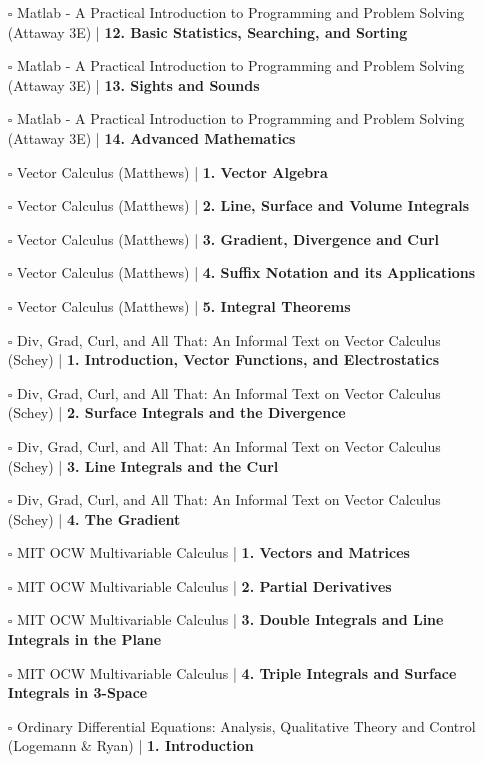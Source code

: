 \documentclass[a4, landscape, 12pt]{article}
\newcommand{\checkbox}{$\square$}%
\begin{document}
\begin{itemize}
{}
\item [\checkbox] Matlab - A Practical Introduction to Programming and Problem Solving (Attaway 3E)  | \textbf{12. Basic Statistics, Searching, and Sorting
}
\item [\checkbox] Matlab - A Practical Introduction to Programming and Problem Solving (Attaway 3E)  | \textbf{13. Sights and Sounds
}
\item [\checkbox] Matlab - A Practical Introduction to Programming and Problem Solving (Attaway 3E)  | \textbf{14. Advanced Mathematics
}
\item [\checkbox] Vector Calculus (Matthews)  | \textbf{1. Vector Algebra
}
\item [\checkbox] Vector Calculus (Matthews)  | \textbf{2. Line, Surface and Volume Integrals
}
\item [\checkbox] Vector Calculus (Matthews)  | \textbf{3. Gradient, Divergence and Curl
}
\item [\checkbox] Vector Calculus (Matthews)  | \textbf{4. Suffix Notation and its Applications
}
\item [\checkbox] Vector Calculus (Matthews)  | \textbf{5. Integral Theorems
}
\item [\checkbox] Div, Grad, Curl, and All That: An Informal Text on Vector Calculus (Schey)  | \textbf{1. Introduction, Vector Functions, and Electrostatics
}
\item [\checkbox] Div, Grad, Curl, and All That: An Informal Text on Vector Calculus (Schey)  | \textbf{2. Surface Integrals and the Divergence
}
\item [\checkbox] Div, Grad, Curl, and All That: An Informal Text on Vector Calculus (Schey)  | \textbf{3. Line Integrals and the Curl
}
\item [\checkbox] Div, Grad, Curl, and All That: An Informal Text on Vector Calculus (Schey)  | \textbf{4. The Gradient
}
\item [\checkbox] MIT OCW Multivariable Calculus  | \textbf{1. Vectors and Matrices
}
\item [\checkbox] MIT OCW Multivariable Calculus  | \textbf{2. Partial Derivatives
}
\item [\checkbox] MIT OCW Multivariable Calculus  | \textbf{3. Double Integrals and Line Integrals in the Plane
}
\item [\checkbox] MIT OCW Multivariable Calculus  | \textbf{4. Triple Integrals and Surface Integrals in 3-Space
}
\item [\checkbox] Ordinary Differential Equations: Analysis, Qualitative Theory and Control (Logemann & Ryan)  | \textbf{1. Introduction
}
\end{itemize}
\end{document}
